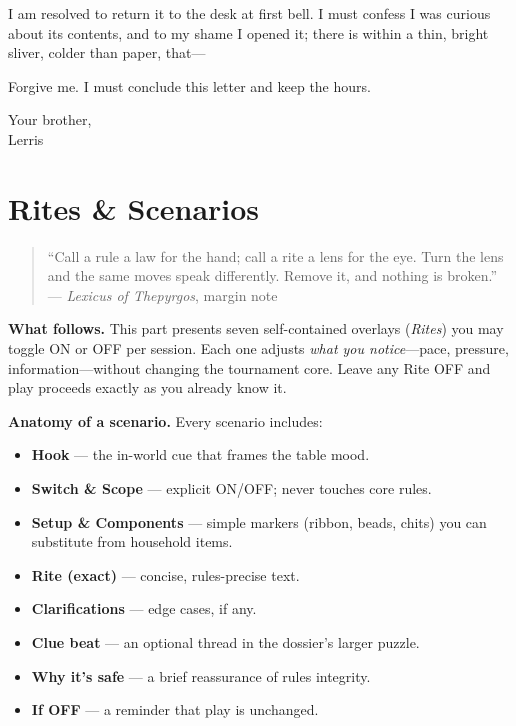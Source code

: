 \documentclass[11pt]{article}
\numberwithin{equation}{section} %
\theoremstyle{plain} %
\theoremstyle{definition} %
\theoremstyle{remark} %
\begin{document}
I am resolved to return it to the desk at first bell. I must confess I was curious about its contents, and to my shame I opened it; there is within a thin, bright sliver, colder than paper, that—

\medskip
\noindent Forgive me. I must conclude this letter and keep the hours.

\medskip
\noindent Your brother, \\
Lerris

\clearpage


\section{Rites \& Scenarios}
\label{part:rites}

\begin{quote}\small
``Call a rule a law for the hand; call a rite a lens for the eye.  
Turn the lens and the same moves speak differently. Remove it, and nothing is broken.''\\
\hfill — \textit{Lexicus of Thepyrgos}, margin note
\end{quote}

\noindent\textbf{What follows.} This part presents seven self-contained overlays (\emph{Rites}) you may toggle \textsc{ON} or \textsc{OFF} per session. Each one adjusts \textit{what you notice}—pace, pressure, information—without changing the tournament core. Leave any Rite \textsc{OFF} and play proceeds exactly as you already know it.

\medskip
\noindent\textbf{Anatomy of a scenario.} Every scenario includes:
\begin{itemize}\setlength\itemsep{0.3em}
  \item \textbf{Hook} — the in-world cue that frames the table mood.
  \item \textbf{Switch \& Scope} — explicit \textsc{ON/OFF}; never touches core rules.
  \item \textbf{Setup \& Components} — simple markers (ribbon, beads, chits) you can substitute from household items.
  \item \textbf{Rite (exact)} — concise, rules-precise text.
  \item \textbf{Clarifications} — edge cases, if any.
  \item \textbf{Clue beat} — an optional thread in the dossier’s larger puzzle.
  \item \textbf{Why it’s safe} — a brief reassurance of rules integrity.
  \item \textbf{If \textsc{OFF}} — a reminder that play is unchanged.
\end{itemize}
\end{document}
